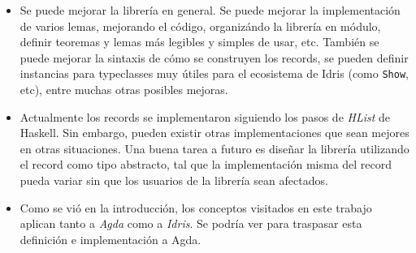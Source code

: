 \begin{itemize}
\item Se puede mejorar la librería en general. Se puede mejorar la implementación de varios lemas, mejorando el código, organizándo la librería en módulo, definir teoremas y lemas más legibles y simples de usar, etc. También se puede mejorar la sintaxis de cómo se construyen los records, se pueden definir instancias para typeclasses muy útiles para el ecosistema de Idris (como \texttt{Show}, etc), entre muchas otras posibles mejoras.
\item Actualmente los records se implementaron siguiendo los pasos de \textit{HList} de Haskell. Sin embargo, pueden existir otras implementaciones que sean mejores en otras situaciones. Una buena tarea a futuro es diseñar la librería utilizando el record como tipo abstracto, tal que la implementación misma del record pueda variar sin que los usuarios de la librería sean afectados. 
\item Como se vió en la introducción, los conceptos visitados en este trabajo aplican tanto a \textit{Agda} como a \textit{Idris}. Se podría ver para traspasar esta definición e implementación a Agda.
\end{itemize}
